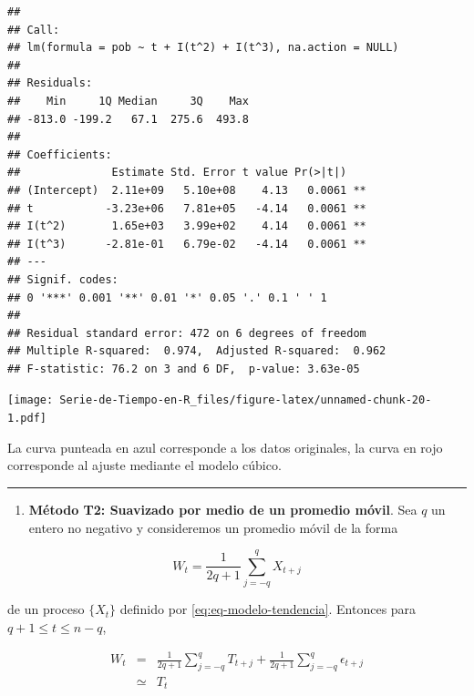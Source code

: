 \documentclass[12pt,]{krantz}
\makeatletter
\newenvironment{Shaded}{\begin{snugshade}}{\end{snugshade}}
\newcommand{\KeywordTok}[1]{\textcolor[rgb]{0.13,0.29,0.53}{\textbf{#1}}}
\newcommand{\DataTypeTok}[1]{\textcolor[rgb]{0.13,0.29,0.53}{#1}}
\newcommand{\StringTok}[1]{\textcolor[rgb]{0.31,0.60,0.02}{#1}}
\newcommand{\OperatorTok}[1]{\textcolor[rgb]{0.81,0.36,0.00}{\textbf{#1}}}
\newcommand{\NormalTok}[1]{#1}
\providecommand{\tightlist}{%
  \setlength{\itemsep}{0pt}\setlength{\parskip}{0pt}}
\newenvironment{kframe}{%
\medskip{}
\setlength{\fboxsep}{.8em}
 \def\at@end@of@kframe{}%
 \ifinner\ifhmode%
  \def\at@end@of@kframe{\end{minipage}}%
  \begin{minipage}{\columnwidth}%
 \fi\fi%
 \def\FrameCommand##1{\hskip\@totalleftmargin \hskip-\fboxsep
 \colorbox{shadecolor}{##1}\hskip-\fboxsep
     \hskip-\linewidth \hskip-\@totalleftmargin \hskip\columnwidth}%
 \MakeFramed {\advance\hsize-\width
   \@totalleftmargin\z@ \linewidth\hsize
   \@setminipage}}%
 {\par\unskip\endMakeFramed%
 \at@end@of@kframe}
\renewenvironment{Shaded}{\begin{kframe}}{\end{kframe}}
\theoremstyle{definition}
\theoremstyle{definition}
\theoremstyle{definition}
\theoremstyle{remark}
\makeatother
\begin{document}
\begin{verbatim}
## 
## Call:
## lm(formula = pob ~ t + I(t^2) + I(t^3), na.action = NULL)
## 
## Residuals:
##    Min     1Q Median     3Q    Max 
## -813.0 -199.2   67.1  275.6  493.8 
## 
## Coefficients:
##              Estimate Std. Error t value Pr(>|t|)   
## (Intercept)  2.11e+09   5.10e+08    4.13   0.0061 **
## t           -3.23e+06   7.81e+05   -4.14   0.0061 **
## I(t^2)       1.65e+03   3.99e+02    4.14   0.0061 **
## I(t^3)      -2.81e-01   6.79e-02   -4.14   0.0061 **
## ---
## Signif. codes:  
## 0 '***' 0.001 '**' 0.01 '*' 0.05 '.' 0.1 ' ' 1
## 
## Residual standard error: 472 on 6 degrees of freedom
## Multiple R-squared:  0.974,  Adjusted R-squared:  0.962 
## F-statistic: 76.2 on 3 and 6 DF,  p-value: 3.63e-05
\end{verbatim}

\begin{Shaded}
\end{Shaded}

\texttt{[image: Serie-de-Tiempo-en-R\_files/figure-latex/unnamed-chunk-20-1.pdf]}

La curva punteada en azul corresponde a los datos originales, la curva
en rojo corresponde al ajuste mediante el modelo cúbico.

\begin{center}\rule{0.5\linewidth}{\linethickness}\end{center}

\begin{enumerate}
\def\labelenumi{\arabic{enumi}.}
\setcounter{enumi}{1}
\tightlist
\item
  \textbf{Método T2: Suavizado por medio de un promedio móvil}. Sea
  \(q\) un entero no negativo y consideremos un promedio móvil de la
  forma
\end{enumerate}

\begin{equation}
W_t = \frac{1}{2q+1}\sum_{j=-q}^{q}X_{t+j}
\label{eq:eq-promedio-movil-orden-q}
\end{equation}

de un proceso \(\{X_t\}\) definido por \eqref{eq:eq-modelo-tendencia}.
Entonces para \(q+1\leq t\leq n-q\),

\begin{eqnarray}
W_t &=& \frac{1}{2q+1}\sum_{j=-q}^qT_{t+j}+\frac{1}{2q+1}\sum_{j=-q}^q\epsilon_{t+j}\\ \nonumber
    &\simeq& T_t \label{eq:eq-media-promedio-movil}
\end{eqnarray}
\end{document}
